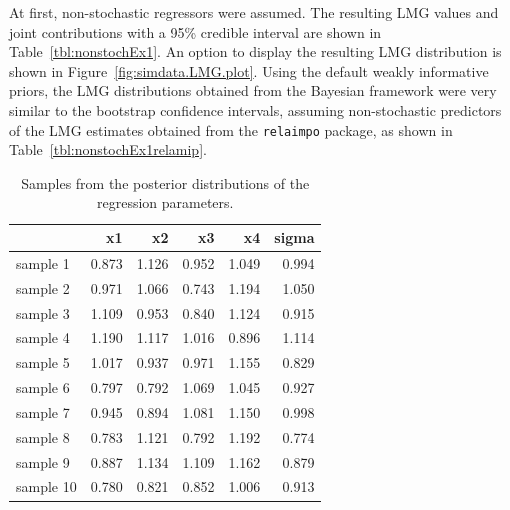 \documentclass[11pt,a4paper,twoside]{book}\usepackage[]{graphicx}\usepackage[]{color}
\newenvironment{knitrout}{}{} %
\begin{document}
At first, non-stochastic regressors were assumed. The resulting LMG values and joint contributions with a 95\% credible interval are shown in Table~\ref{tbl:nonstochEx1}. An option to display the resulting LMG distribution is shown in Figure~\ref{fig:simdata.LMG.plot}.  Using the default weakly informative priors, the LMG distributions obtained from the Bayesian framework were very similar to the bootstrap confidence intervals, assuming non-stochastic predictors of the LMG estimates obtained from the \texttt{relaimpo} package, as shown in Table~\ref{tbl:nonstochEx1relamip}. 





\begin{knitrout}
\color{fgcolor}\begin{table}

\caption{\label{tab:simdata.postsample2}Samples from the posterior distributions of the regression parameters.}
\centering
\begin{tabular}[t]{lrrrrr}
\toprule
  & x1 & x2 & x3 & x4 & sigma\\
\midrule
sample 1 & 0.873 & 1.126 & 0.952 & 1.049 & 0.994\\
sample 2 & 0.971 & 1.066 & 0.743 & 1.194 & 1.050\\
sample 3 & 1.109 & 0.953 & 0.840 & 1.124 & 0.915\\
sample 4 & 1.190 & 1.117 & 1.016 & 0.896 & 1.114\\
sample 5 & 1.017 & 0.937 & 0.971 & 1.155 & 0.829\\
sample 6 & 0.797 & 0.792 & 1.069 & 1.045 & 0.927\\
sample 7 & 0.945 & 0.894 & 1.081 & 1.150 & 0.998\\
sample 8 & 0.783 & 1.121 & 0.792 & 1.192 & 0.774\\
sample 9 & 0.887 & 1.134 & 1.109 & 1.162 & 0.879\\
sample 10 & 0.780 & 0.821 & 0.852 & 1.006 & 0.913\\
\bottomrule
\end{tabular}
\end{table}


\end{knitrout}
\end{document}
